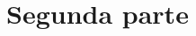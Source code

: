 \begin{Solucion}
  
\end{Solucion}

\begin{Problema}{7}
  
\end{Problema}

\begin{Solucion}
  
\end{Solucion}

\begin{Problema}{8}
  
\end{Problema}

\begin{Solucion}
  
\end{Solucion}

\begin{Problema}{9}
  
\end{Problema}

\begin{Solucion}
  
\end{Solucion}

\begin{Problema}{10}
  
\end{Problema}

\begin{Solucion}
  
\end{Solucion}

\begin{Problema}{5}
  
\end{Problema}

\begin{Solucion}
  
\end{Solucion}

\begin{Problema}{6}
  
\end{Problema}

\begin{Solucion}
  
\end{Solucion}


\section{Segunda parte}
\label{sec:segunda-parte}

